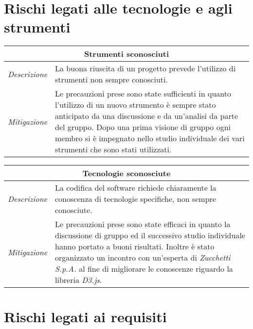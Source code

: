 \section{Rischi legati alle tecnologie e agli strumenti}

\begin{table}[H]
    \centering
    \begin{tabular}{|p{2cm}|p{10cm}|}
    \hline
    \multicolumn{2}{|c|}{\textbf{Strumenti sconosciuti}} \\ \hline
    \multicolumn{1}{|l|}{\textit{Descrizione}} & La buona riuscita di un progetto prevede l'utilizzo di strumenti non sempre conosciuti. \\ \hline
    \multicolumn{1}{|l|}{\textit{Mitigazione}} & Le precauzioni prese sono state sufficienti in quanto l'utilizzo di un nuovo strumento è sempre stato anticipato da una discussione e da un'analisi da parte del gruppo. Dopo una prima visione di gruppo ogni membro si è impegnato nello studio individuale dei vari strumenti che sono stati utilizzati. \\ \hline
    \end{tabular}
\end{table}

\begin{table}[H]
    \centering
    \begin{tabular}{|p{2cm}|p{10cm}|}
    \hline
    \multicolumn{2}{|c|}{\textbf{Tecnologie sconosciute}} \\ \hline
    \multicolumn{1}{|l|}{\textit{Descrizione}} & La codifica del software richiede chiaramente la conoscenza di tecnologie specifiche, non sempre conosciute. \\ \hline
    \multicolumn{1}{|l|}{\textit{Mitigazione}} & Le precauzioni prese sono state efficaci in quanto la discussione di gruppo ed il successivo studio individuale hanno portato a buoni risultati. Inoltre è stato organizzato un incontro con un'esperta di \textit{Zucchetti S.p.A.} al fine di migliorare le conoscenze riguardo la libreria \textit{D3.js}. \\ \hline
    \end{tabular}
\end{table}



\section{Rischi legati ai requisiti}


